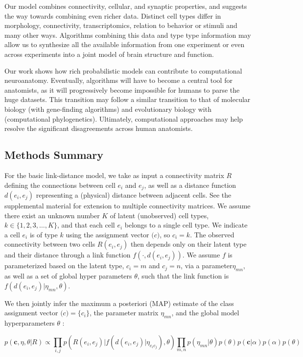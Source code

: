 \documentclass{article}
\renewcommand{\vec}[1]{\mathbf{#1}}
\begin{document}
Our model combines connectivity, cellular, and synaptic properties,
and suggests the way towards combining even richer data. Distinct cell
types differ in morphology, connectivity, transcriptomics, relation to
behavior or stimuli and many other ways. Algorithms combining this
data and type type information may allow us to synthesize all the
available information from one experiment or even across experiments
into a joint model of brain structure and function.

Our work shows how rich probabilistic models can contribute to computational neuroanatomy. 
Eventually, algorithms will have to become a central tool for
anatomists, as it will progressively become impossible for humans to
parse the huge datasets. This transition may follow a similar
transition to that of molecular biology (with gene-finding
algorithms) and evolutionary biology with (computational
phylogenetics). Ultimately, computational approaches may help resolve the significant
disagreements across human anatomists. 


\subsection*{Methods Summary}

For the basic link-distance model, we take as input a connectivity
matrix $R$ defining the connections between cell $e_i$ and $e_j$, as
well as a distance function $d(e_i, e_j)$ representing a (physical)
distance between adjacent cells.  See
the supplemental material for extension to multiple connectivity
matrices. We assume there exist an unknown number $K$ of latent
(unobserved) cell types, $k \in \{1, 2, 3, \dots, K\}$, and that each
cell $e_i$ belongs to a single cell type. We indicate a cell $e_i$ is
of type $k$ using the assignment vector $\vec(c)$, so $c_i = k$. The
observed connectivity between two cells $R(e_i, e_j)$ then depends
only on their latent type and their distance through a link function
$f(\cdot, d(e_i, e_j))$. We assume $f$ is parameterized based on the
latent type, $c_i=m$ and $c_j=n$, via a parameter$\eta_{mn}$, as well
as a set of global hyper parameters $\theta$, such that the link
function is $f(d(e_i, e_j) | \eta_{mn}, \theta)$.

We then jointly infer the maximum a posteriori (MAP) estimate of the
class assignment vector $\vec(c) = \{c_i\}$, the parameter matrix
$\eta_{mn}$, and the global model hyperparameters $\theta$ :

\begin{equation}
  p(\vec{c}, \eta, \theta | R ) \propto \prod_{i, j} p(R(e_i, e_j) | f(d(e_i, e_j) | \eta_{c_ic_j}), \theta) \prod_{m, n} p(\eta_{mn} | \theta)  p(\theta) p(\vec{c} | \alpha) p(\alpha) p(\theta)
\end{equation}
\end{document}
